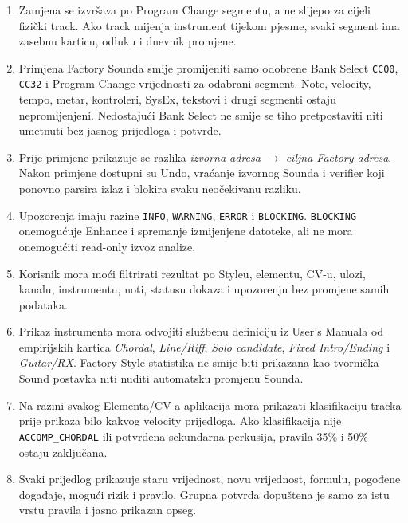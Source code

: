 \documentclass[11pt]{article}
\begin{document}
\begin{enumerate}[label=A\arabic*.]
    \item Zamjena se izvršava po Program Change segmentu, a ne slijepo za cijeli
    fizički track. Ako track mijenja instrument tijekom pjesme, svaki segment
    ima zasebnu karticu, odluku i dnevnik promjene.

    \item Primjena Factory Sounda smije promijeniti samo odobrene Bank Select
    \texttt{CC00}, \texttt{CC32} i Program Change vrijednosti za odabrani
    segment. Note, velocity, tempo, metar, kontroleri, SysEx, tekstovi i drugi
    segmenti ostaju nepromijenjeni. Nedostajući Bank Select ne smije se tiho
    pretpostaviti niti umetnuti bez jasnog prijedloga i potvrde.

    \item Prije primjene prikazuje se razlika \emph{izvorna adresa $\to$ ciljna
    Factory adresa}. Nakon primjene dostupni su Undo, vraćanje izvornog Sounda
    i verifier koji ponovno parsira izlaz i blokira svaku neočekivanu razliku.

    \item Upozorenja imaju razine \texttt{INFO}, \texttt{WARNING},
    \texttt{ERROR} i \texttt{BLOCKING}. \texttt{BLOCKING} onemogućuje Enhance
    i spremanje izmijenjene datoteke, ali ne mora onemogućiti read-only izvoz
    analize.

    \item Korisnik mora moći filtrirati rezultat po Styleu, elementu, CV-u,
    ulozi, kanalu, instrumentu, noti, statusu dokaza i upozorenju bez promjene
    samih podataka.

    \item Prikaz instrumenta mora odvojiti službenu definiciju iz User's
    Manuala od empirijskih kartica \emph{Chordal}, \emph{Line/Riff},
    \emph{Solo candidate}, \emph{Fixed Intro/Ending} i \emph{Guitar/RX}.
    Factory Style statistika ne smije biti prikazana kao tvornička Sound
    postavka niti nuditi automatsku promjenu Sounda.

    \item Na razini svakog Elementa/CV-a aplikacija mora prikazati klasifikaciju
    tracka prije prikaza bilo kakvog velocity prijedloga. Ako klasifikacija nije
    \texttt{ACCOMP\_CHORDAL} ili potvrđena sekundarna perkusija, pravila 35\% i
    50\% ostaju zaključana.

    \item Svaki prijedlog prikazuje staru vrijednost, novu vrijednost, formulu,
    pogođene događaje, mogući rizik i pravilo. Grupna potvrda dopuštena je samo
    za istu vrstu pravila i jasno prikazan opseg.


\end{enumerate}
\end{document}

